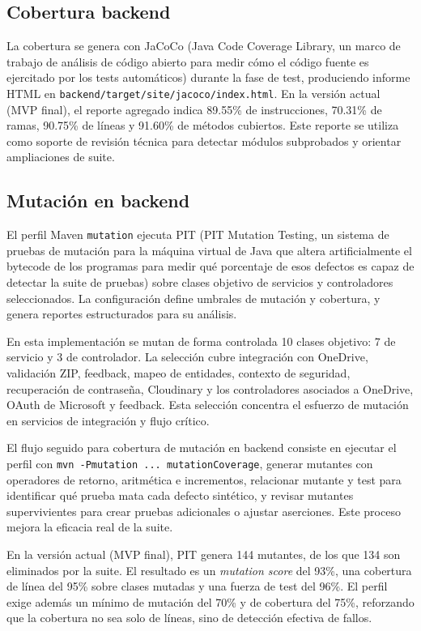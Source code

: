 \subsection{Cobertura backend}

La cobertura se genera con JaCoCo \cite{jacoco} (Java Code Coverage Library, un marco de trabajo de an\'alisis de c\'odigo abierto para medir c\'omo el c\'odigo fuente es ejercitado por los tests autom\'aticos) durante la fase de test, produciendo informe HTML en
\texttt{backend/target/site/jacoco/index.html}. En la versi\'on actual (MVP final), el reporte agregado indica 89.55\% de instrucciones, 70.31\% de ramas, 90.75\% de l\'ineas y 91.60\% de m\'etodos cubiertos. Este reporte se utiliza como soporte de revisi\'on t\'ecnica para detectar m\'odulos subprobados y orientar ampliaciones de suite.

\subsection{Mutaci\'on en backend}

El perfil Maven \texttt{mutation} ejecuta PIT (PIT Mutation Testing, un sistema de pruebas de mutaci\'on para la m\'aquina virtual de Java que altera artificialmente el bytecode de los programas para medir qu\'e porcentaje de esos defectos es capaz de detectar la suite de pruebas) sobre clases objetivo de servicios y controladores seleccionados.
La configuraci\'on define umbrales de mutaci\'on y cobertura,
y genera reportes estructurados para su an\'alisis.

En esta implementaci\'on se mutan de forma controlada 10 clases objetivo:
7 de servicio y 3 de controlador. La selecci\'on cubre integraci\'on con
OneDrive, validaci\'on ZIP, feedback, mapeo de entidades, contexto de
seguridad, recuperaci\'on de contrase\~na, Cloudinary y los controladores
asociados a OneDrive, OAuth de Microsoft y feedback. Esta selecci\'on
concentra el esfuerzo de mutaci\'on en servicios de integraci\'on y flujo
cr\'itico.

El flujo seguido para cobertura de mutaci\'on en backend consiste en ejecutar el perfil con \texttt{mvn -Pmutation ... mutationCoverage}, generar mutantes con operadores de retorno, aritm\'etica e incrementos, relacionar mutante y test para identificar qu\'e prueba mata cada defecto sint\'etico, y revisar mutantes supervivientes para crear pruebas adicionales o ajustar aserciones. Este proceso mejora la eficacia real de la suite.

En la versi\'on actual (MVP final), PIT genera 144 mutantes, de los que 134 son eliminados por la suite. El resultado es un \textit{mutation score} del 93\%, una cobertura de l\'inea del 95\% sobre clases mutadas y una fuerza de test del 96\%. El perfil exige adem\'as un m\'inimo de mutaci\'on del 70\% y de cobertura del 75\%, reforzando que la cobertura no sea solo de l\'ineas, sino de detecci\'on efectiva de fallos.

